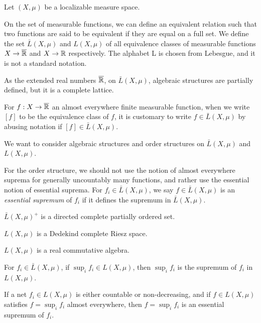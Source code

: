 \documentclass{../../large}
\begin{document}
\begin{prb}
Let $(X,\mu)$ be a localizable measure space.

On the set of measurable functions, we can define an equivalent relation such that two functions are said to be equivalent if they are equal on a full set.
We define the set $\bar L(X,\mu)$ and $L(X,\mu)$ of all equivalence classes of measurable functions $X\to\overline{\mathbb{R}}$ and $X\to\mathbb{R}$ respectively.
The alphabet L is chosen from Lebesgue, and it is not a standard notation.

As the extended real numbers $\overline{\mathbb{R}}$, on $\bar L(X,\mu)$, algebraic structures are partially defined, but it is a complete lattice.

For $f:X\to\overline{\mathbb{R}}$ an almost everywhere finite measurable function, when we write $[f]$ to be the equivalence class of $f$, it is customary to write $f\in\bar L(X,\mu)$ by abusing notation if $[f]\in\bar L(X,\mu)$.



We want to consider algebraic structures and order structures on $\bar L(X,\mu)$ and $L(X,\mu)$.

For the order structure, we should not use the notion of almost everywhere suprema for generally uncountably many functions, and rather use the essential notion of essential suprema.
For $f_i\in\bar L(X,\mu)$, we say $f\in\bar L(X,\mu)$ is an \emph{essential supremum} of $f_i$ if it defines the supremum in $\bar L(X,\mu)$.

\begin{parts}
\item $\bar L(X,\mu)^+$ is a directed complete partially ordered set.
\item $L(X,\mu)$ is a Dedekind complete Riesz space.
\item $L(X,\mu)$ is a real commutative algebra.
\item For $f_i\in\bar L(X,\mu)$, if $\sup_if_i\in L(X,\mu)$, then $\sup_if_i$ is the supremum of $f_i$ in $L(X,\mu)$.
\item If a net $f_i\in L(X,\mu)$ is either countable or non-decreasing, and if $f\in L(X,\mu)$ satisfies $f=\sup_if_i$ almost everywhere, then $f=\sup_if_i$ is an essential supremum of $f_i$.
\end{parts}
\end{prb}
\end{document}
